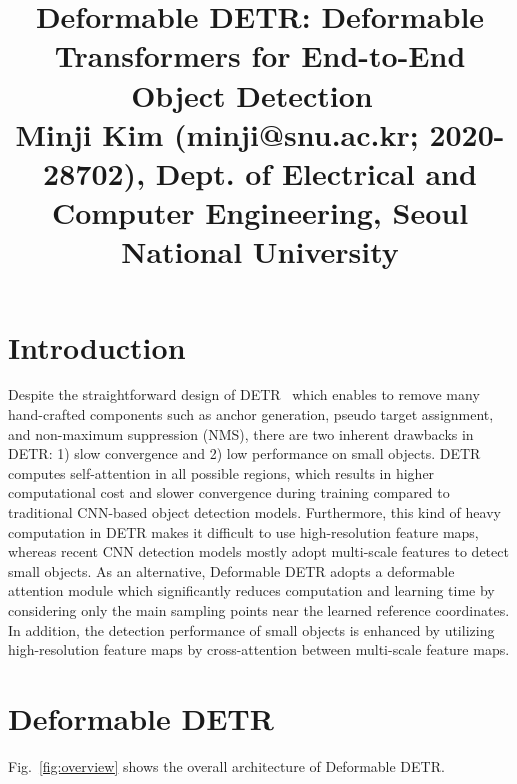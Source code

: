 \documentclass[10pt,twocolumn,letterpaper]{article}
\begin{document}
\title{Deformable DETR: Deformable Transformers for End-to-End Object Detection~\cite{deformabledetr} \\ {\rm {\normalsize Minji Kim (minji@snu.ac.kr; 2020-28702), Dept. of Electrical and Computer Engineering, Seoul National University}}}   %

\maketitle
\thispagestyle{empty}


\section{Introduction}
Despite the straightforward design of DETR~\cite{detr} which enables to remove many hand-crafted components such as anchor generation, pseudo target assignment, and non-maximum suppression (NMS), there are two inherent drawbacks in DETR: 1) slow convergence and 2) low performance on small objects.
DETR computes self-attention in all possible regions, which results in higher computational cost and slower convergence during training compared to traditional CNN-based object detection models.
Furthermore, this kind of heavy computation in DETR makes it difficult to use high-resolution feature maps, whereas recent CNN detection models mostly adopt multi-scale features to detect small objects.
As an alternative, Deformable DETR adopts a deformable attention module which significantly reduces computation and learning time by considering only the main sampling points near the learned reference coordinates.
In addition, the detection performance of small objects is enhanced by utilizing high-resolution feature maps by cross-attention between multi-scale feature maps.



\section{Deformable DETR}

Fig.~\ref{fig:overview} shows the overall architecture of Deformable DETR.
\end{document}
